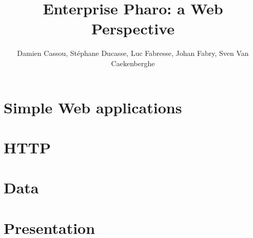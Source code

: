 \documentclass[10pt,twoside,showtrims]{support/latex/sbabook}
\begin{document}
\frontmatter
\author{Damien Cassou, Stéphane Ducasse, Luc Fabresse, Johan Fabry, Sven Van Caekenberghe}
\title{Enterprise Pharo: a Web Perspective}
\maketitle
\tableofcontents

\sloppy %
\mainmatter



\part{Simple Web applications}







\part{HTTP}














\part{Data}











\part{Presentation}




\end{document}
